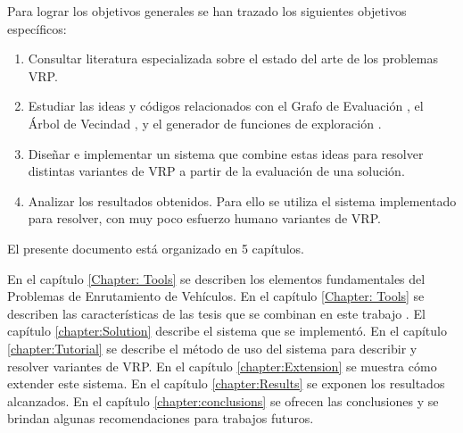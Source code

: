 Para lograr los objetivos generales se han trazado los siguientes objetivos específicos:

\begin{enumerate}
	\item Consultar literatura especializada sobre el estado del arte de los problemas VRP.
	\item Estudiar las ideas y códigos relacionados con el Grafo de Evaluación \cite{JJ}, el Árbol de Vecindad \cite{Heidy}, y el generador de funciones de exploración \cite{Hector}.
	\item Diseñar e implementar un sistema que combine estas ideas para resolver distintas variantes de VRP a partir de la evaluación de una solución.
	\item Analizar los resultados obtenidos. Para ello se utiliza el sistema implementado para resolver, con muy poco esfuerzo humano variantes de VRP.
\end{enumerate}
El presente documento está organizado en 5 capítulos.


En el capítulo \ref{Chapter: Tools} se describen los elementos fundamentales del Problemas de Enrutamiento de Vehículos. En el capítulo \ref{Chapter: Tools} se describen las características de las tesis que se combinan en este trabajo \cite{JJ,Heidy,Hector}. El capítulo \ref{chapter:Solution} describe el sistema que se implementó. En el capítulo \ref{chapter:Tutorial} se describe el método de uso del sistema para describir y resolver variantes de VRP. En el capítulo \ref{chapter:Extension} se muestra cómo extender este sistema. En el capítulo \ref{chapter:Results} se exponen los resultados alcanzados. En el capítulo \ref{chapter:conclusions} se ofrecen las conclusiones y se brindan algunas recomendaciones para trabajos futuros.





